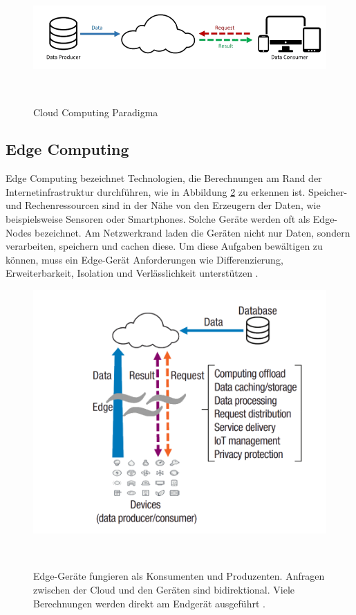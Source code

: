 \documentclass{sigchi}
\begin{document}
\begin{figure}
\centering
  \includegraphics[width=0.65\columnwidth]{figures/cloud-computing-structure.PNG}
  \caption{Cloud Computing Paradigma \cite{vision-challenges:2016}}~\label{fig:cloud-computing}
\end{figure}

\subsection{Edge Computing}
Edge Computing bezeichnet Technologien, die Berechnungen am Rand der Internetinfrastruktur durchführen, wie in Abbildung \ref{fig:edge-computing} zu erkennen ist. Speicher- und Rechenressourcen sind in der Nähe von den Erzeugern der Daten, wie beispielsweise Sensoren oder Smartphones. Solche Geräte werden oft als  Edge-Nodes bezeichnet. Am Netzwerkrand laden die Geräten nicht nur Daten, sondern verarbeiten, speichern und cachen diese. Um diese Aufgaben bewältigen zu können, muss ein Edge-Gerät Anforderungen wie Differenzierung, Erweiterbarkeit, Isolation und Verlässlichkeit unterstützen \cite{promise-edge-computing:2016}.

\begin{figure}
\centering
  \includegraphics[width=0.65\columnwidth]{figures/edge-computing-structure.PNG}
  \caption{Edge-Geräte fungieren als Konsumenten und Produzenten. Anfragen zwischen der Cloud und den Geräten sind bidirektional. Viele Berechnungen werden direkt am Endgerät ausgeführt \cite{promise-edge-computing:2016}.}~\label{fig:edge-computing}
\end{figure}
\end{document}

